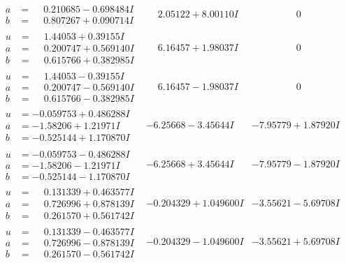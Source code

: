 \documentclass[1p]{elsarticle_modified}
\theoremstyle{definition}
\begin{document}
$$\begin{array}{c|c|c}
\begin{aligned}
a &= \phantom{-}0.210685 - 0.698484 I \\
b &= \phantom{-}0.807267 + 0.090714 I\end{aligned}
 & \phantom{-}2.05122 + 8.00110 I & \phantom{-0.000000 } 0 \\ \hline\begin{aligned}
u &= \phantom{-}1.44053 + 0.39155 I \\
a &= \phantom{-}0.200747 + 0.569140 I \\
b &= \phantom{-}0.615766 + 0.382985 I\end{aligned}
 & \phantom{-}6.16457 + 1.98037 I & \phantom{-0.000000 } 0 \\ \hline\begin{aligned}
u &= \phantom{-}1.44053 - 0.39155 I \\
a &= \phantom{-}0.200747 - 0.569140 I \\
b &= \phantom{-}0.615766 - 0.382985 I\end{aligned}
 & \phantom{-}6.16457 - 1.98037 I & \phantom{-0.000000 } 0 \\ \hline\begin{aligned}
u &= -0.059753 + 0.486288 I \\
a &= -1.58206 + 1.21971 I \\
b &= -0.525144 + 1.170870 I\end{aligned}
 & -6.25668 - 3.45644 I & -7.95779 + 1.87920 I \\ \hline\begin{aligned}
u &= -0.059753 - 0.486288 I \\
a &= -1.58206 - 1.21971 I \\
b &= -0.525144 - 1.170870 I\end{aligned}
 & -6.25668 + 3.45644 I & -7.95779 - 1.87920 I \\ \hline\begin{aligned}
u &= \phantom{-}0.131339 + 0.463577 I \\
a &= \phantom{-}0.726996 + 0.878139 I \\
b &= \phantom{-}0.261570 + 0.561742 I\end{aligned}
 & -0.204329 + 1.049600 I & -3.55621 - 5.69708 I \\ \hline\begin{aligned}
u &= \phantom{-}0.131339 - 0.463577 I \\
a &= \phantom{-}0.726996 - 0.878139 I \\
b &= \phantom{-}0.261570 - 0.561742 I\end{aligned}
 & -0.204329 - 1.049600 I & -3.55621 + 5.69708 I \\ \hline\begin{aligned}

\end{aligned}
\end{array}$$
\end{document}
